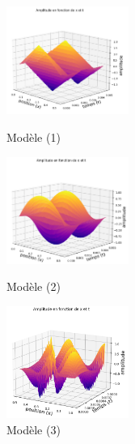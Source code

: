 \begin{figure}[H]
  \includegraphics[width=4cm]{5.png}
  \caption{Modèle (1)}\label{fig}
\endminipage\hfill
{}
  \includegraphics[width=4cm]{6_pro.png}
  \caption{Modèle (2)}\label{fig}
\endminipage\hfill
{}%
  \includegraphics[width=4cm]{9_RK.png}
  \caption{Modèle (3)}\label{fig}
\endminipage
\end{figure}
